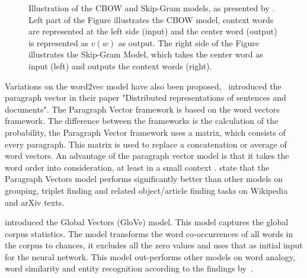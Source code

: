 \documentclass[../../Thesis.tex]{subfiles}
\begin{document}
\begin{jumpin}
\begin{center}
\begin{figure}[hbt]
\caption{Illustration of the CBOW and Skip-Gram models, as presented by \citet{chen2017convolutional}. Left part of the Figure illustrates the CBOW model, context words are represented at the left side (input) and the center word (output) is represented as $v(w)$ as output. The right side of the Figure illustrates the Skip-Gram Model, which takes the center word as input (left) and outputs the context words (right).}\label{figure:word2vecModels}
\end{figure}
\FloatBarrier
\end{center}
Variations on the word2vec model have also been proposed,~\citet{le2014distributed} introduced the paragraph vector in their paper "Distributed representations of sentences and documents". The Paragraph Vector framework is based on the word vectors framework. The difference between the frameworks is the calculation of the probability, the Paragraph Vector framework uses a matrix, which consists of every paragraph. This matrix is used to replace a concatenation or average of word vectors. An advantage of the paragraph vector model is that it takes the word order into consideration, at least in a small context \cite{le2014distributed}. \citet{dai2015document} state that the Paragraph Vectors model performs significantly better than other models on grouping, triplet finding and related object/article finding tasks on Wikipedia and arXiv texts.

\citet{pennington2014glove} introduced the Global Vectors (GloVe) model. This model captures the global corpus statistics. The model transforms the word co-occurrences of all words in the corpus to chances, it excludes all the zero values and uses that as initial input for the neural network. This model out-performs other models on word analogy, word similarity and entity recognition according to the findings by~\citet{pennington2014glove}.\\


\end{jumpin}
\end{document}
